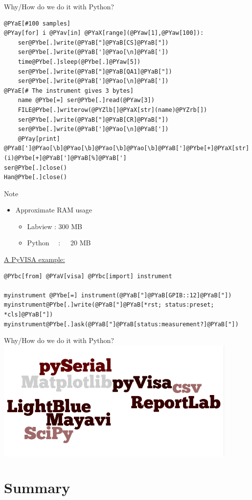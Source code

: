 \documentclass{beamer}
\begin{document}
\begin{frame}[fragile]{Why/How do we do it with Python?}
\begin{Verbatim}[commandchars=@\[\]]                                               
@PYaE[#100 samples]
@PYay[for] i @PYav[in] @PYaX[range](@PYaw[1],@PYaw[100]):
    ser@PYbe[.]write(@PYaB["]@PYaB[CS]@PYaB["])
    ser@PYbe[.]write(@PYaB[']@PYao[\n]@PYaB['])
    time@PYbe[.]sleep(@PYbe[.]@PYaw[5])
    ser@PYbe[.]write(@PYaB["]@PYaB[QA1]@PYaB["])
    ser@PYbe[.]write(@PYaB[']@PYao[\n]@PYaB['])
@PYaE[# The instrument gives 3 bytes]
    name @PYbe[=] ser@PYbe[.]read(@PYaw[3])
    FILE@PYbe[.]writerow(@PYZlb[]@PYaX[str](name)@PYZrb[])
    ser@PYbe[.]write(@PYaB["]@PYaB[CR]@PYaB["])
    ser@PYbe[.]write(@PYaB[']@PYao[\n]@PYaB['])
    @PYay[print] @PYaB[']@PYao[\b]@PYao[\b]@PYao[\b]@PYao[\b]@PYaB[']@PYbe[+]@PYaX[str](i)@PYbe[+]@PYaB[']@PYaB[%]@PYaB[']
ser@PYbe[.]close()
Han@PYbe[.]close()
\end{Verbatim}
\end{frame}
\begin{frame}[fragile]{Note}
  \begin{block}{}
  \begin{itemize}
  	\item Approximate RAM usage 
	\begin{itemize}
		\item Labview : 300 MB 
		\item Python \ \ :\ \ \  20 MB
	\end{itemize}
  \end{itemize}
\end{block}
\underline{A PyVISA example:}
\begin{Verbatim}[commandchars=@\[\]]
@PYbc[from] @PYaV[visa] @PYbc[import] instrument

myinstrument @PYbe[=] instrument(@PYaB["]@PYaB[GPIB::12]@PYaB["])
myinstrument@PYbe[.]write(@PYaB["]@PYaB[*rst; status:preset; *cls]@PYaB["])
myinstrument@PYbe[.]ask(@PYaB["]@PYaB[status:measurement?]@PYaB["])
\end{Verbatim}
\end{frame}

\begin{frame}{Why/How do we do it with Python?}
    \includegraphics[width=119mm,height=60mm]{modules.png}
\end{frame}


\section*{Summary}
\end{document}
